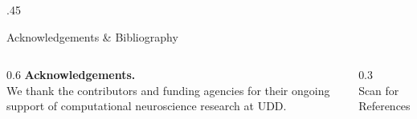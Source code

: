 \documentclass[final]{beamer}
\begin{document}
\begin{frame}[fragile,t]
\begin{columns}[T]
\begin{column}{.45\textwidth}
      \begin{block}{Acknowledgements \& Bibliography}
        \begin{columns}[T]
          \begin{column}{0.6\textwidth}
            \textbf{Acknowledgements.}\\
            We thank the contributors and funding agencies for their ongoing support of computational neuroscience research at UDD.
          \end{column}
          \begin{column}{0.3\textwidth}
            \centering
             \\
            \vspace{1ex}
            \normalsize Scan for References
          \end{column}
        \end{columns}
      \end{block}

    \end{column}
  \end{columns}
\end{frame}
\end{document}
